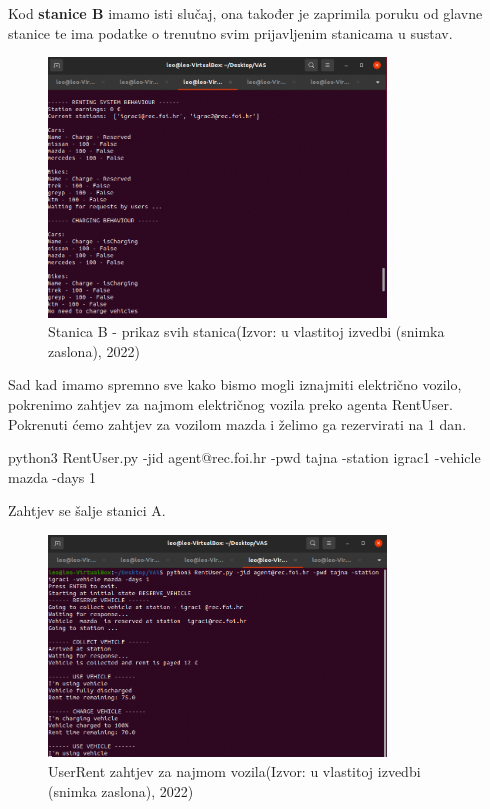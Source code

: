 \documentclass{foi}
\begin{document}
Kod \textbf{stanice B} imamo isti slučaj, ona također je zaprimila poruku od glavne stanice te ima podatke o trenutno svim prijavljenim stanicama u sustav.

\begin{figure}[H]
	\centering
	\includegraphics[width=0.8\textwidth]{slike/vas6}
	\caption{Stanica B - prikaz svih stanica(Izvor: u vlastitoj izvedbi (snimka zaslona), 2022)}
\end{figure}

Sad kad imamo spremno sve kako bismo mogli iznajmiti električno vozilo, pokrenimo zahtjev za najmom električnog vozila preko agenta RentUser. Pokrenuti ćemo zahtjev za vozilom mazda i želimo ga rezervirati na 1 dan.

python3 RentUser.py -jid agent@rec.foi.hr -pwd tajna -station igrac1 -vehicle mazda -days 1

Zahtjev se šalje stanici A.

\pagebreak

\begin{figure}[H]
	\centering
	\includegraphics[width=0.8\textwidth]{slike/vas7}
	\caption{UserRent zahtjev za najmom vozila(Izvor: u vlastitoj izvedbi (snimka zaslona), 2022)}
\end{figure}
\end{document}
